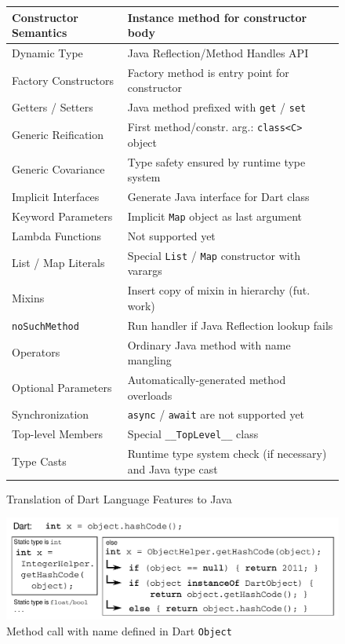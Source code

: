 \documentclass[sigplan,9pt]{acmart}
\begin{document}
\begin{figure}[!tp]
\small
\begin{tabularx}{\columnwidth}{|l|X|}
\hline \hline
Constructor Semantics & Instance method for constructor body \\ \hline
Dynamic Type & Java Reflection/Method Handles API \\ \hline
Factory Constructors & Factory method is entry point for constructor \\ \hline
Getters / Setters & Java method prefixed with \texttt{get} / \texttt{set} \\ \hline
Generic Reification & First method/constr. arg.: \texttt{class<C>} object \\ \hline
Generic Covariance & Type safety ensured by runtime type system \\ \hline
Implicit Interfaces & Generate Java interface for Dart class \\ \hline
Keyword Parameters & Implicit \texttt{Map} object as last argument \\ \hline
Lambda Functions & Not supported yet \\ \hline
List / Map Literals & Special \texttt{List} / \texttt{Map} constructor with varargs \\ \hline
Mixins & Insert copy of mixin in hierarchy (fut. work) \\ \hline
\texttt{noSuchMethod} & Run handler if Java Reflection lookup fails \\ \hline
Operators & Ordinary Java method with name mangling \\ \hline
Optional Parameters & Automatically-generated method overloads \\ \hline
Synchronization & \texttt{async} / \texttt{await} are not supported yet \\ \hline
Top-level Members & Special \texttt{\_\_TopLevel\_\_} class \\ \hline
Type Casts & Runtime type system check (if necessary) and Java type cast \\
\hline \hline
\end{tabularx}
    \caption{Translation of Dart Language Features to Java}
        \vspace{-5pt}
    \label{fig:translation_overview}
\end{figure}
\begin{figure}[!tp]
\includegraphics[width=\columnwidth]{helper_class.pdf}
    \vspace{-10pt}
    \caption{Method call with name defined in Dart \texttt{Object}}
    \vspace{-5pt}
    \label{fig:helper_object}
\end{figure}
\end{document}
